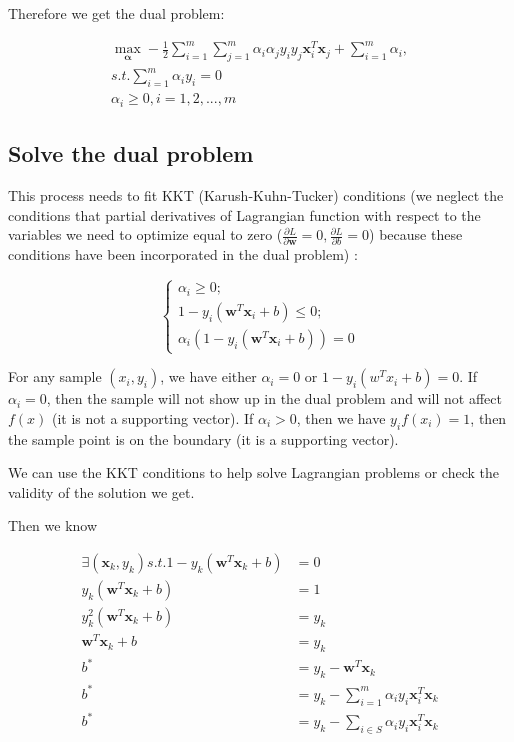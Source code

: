 \documentclass{article}
\begin{document}
Therefore we get the dual problem:

\begin{gather*}
\max_{\boldsymbol{\alpha}} -\frac{1}{2}\sum_{i=1}^{m}{\sum_{j=1}^{m}{\alpha_i \alpha_j y_i y_j \boldsymbol{x}_i^T \boldsymbol{x}_j}} + \sum_{i=1}^{m}{\alpha_i},  \\
s.t. \sum_{i=1}^{m}{\alpha_i y_i} = 0 \\
\alpha_i \geq 0, i=1,2,...,m
\end{gather*}

\subsection{Solve the dual problem}

This process needs to fit KKT (Karush-Kuhn-Tucker) conditions (we neglect the conditions that partial derivatives of Lagrangian function with respect to the variables we need to optimize equal to zero ($\frac{\partial L}{\partial \boldsymbol{w}} = 0, \frac{\partial L}{\partial b} = 0$) because these conditions have been incorporated in the dual problem) :

\begin{equation}
\begin{cases} \alpha_i \geq 0; \\ 1-y_i(\boldsymbol{w}^T\boldsymbol{x}_i + b) \leq 0; \\ \alpha_i(1-y_i(\boldsymbol{w}^T\boldsymbol{x}_i + b)) = 0 \end{cases}
\end{equation}

For any sample $(x_i, y_i)$, we have either $\alpha_i = 0$ or $1-y_i(w^Tx_i + b) = 0$. If $\alpha_i = 0$, then the sample will not show up in the dual problem and will not affect $f(x)$ (it is not a supporting vector). If $\alpha_i > 0$, then we have $y_if(x_i) = 1$, then the sample point is on the boundary (it is a supporting vector).

We can use the KKT conditions to help solve Lagrangian problems or check the validity of the solution we get.

Then we know

\begin{equation}
\begin{split}
\exists (\boldsymbol{x}_k, y_k) s.t. 1-y_k(\boldsymbol{w}^T\boldsymbol{x}_k + b) &= 0 \\
y_k(\boldsymbol{w}^T\boldsymbol{x}_k + b) &= 1 \\
y_k^2(\boldsymbol{w}^T\boldsymbol{x}_k + b) &= y_k \\
\boldsymbol{w}^T\boldsymbol{x}_k + b &= y_k \\
b^* &= y_k - \boldsymbol{w}^T\boldsymbol{x}_k \\
b^* &= y_k - \sum_{i=1}^{m}{\alpha_i y_i \boldsymbol{x}_i^T \boldsymbol{x}_k} \\
b^* &= y_k - \sum_{i \in S}{\alpha_i y_i \boldsymbol{x}_i^T \boldsymbol{x}_k}
\end{split}
\end{equation}
\end{document}
